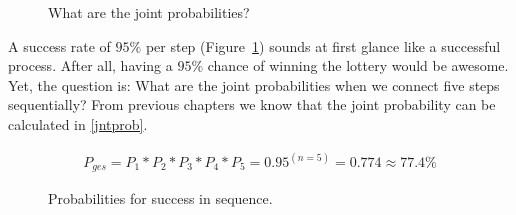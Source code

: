 \documentclass[
  a4paper,
]{scrbook}
\begin{document}
\begin{figure}[H]


\caption{\label{fig-steps-prob-script}What are the joint probabilities?}

\end{figure}%

A success rate of \(95\%\) per step (Figure~\ref{fig-steps-prob-script})
sounds at first glance like a successful process. After all, having a
\(95\%\) chance of winning the lottery would be awesome. Yet, the
question is: What are the joint probabilities when we connect five steps
sequentially? From previous chapters we know that the joint probability
can be calculated in \eqref{jntprob}.

\begin{align}
P_{ges} = P_1 * P_2 * P_3 * P_4 * P_5 = 0.95^{(n=5)}=0.774 \approx 77.4\% \label{jntprob}
\end{align}

\begin{figure}[ht]


\caption{\label{fig-prodprob-scr}Probabilities for success in sequence.}

\end{figure}%
\end{document}
